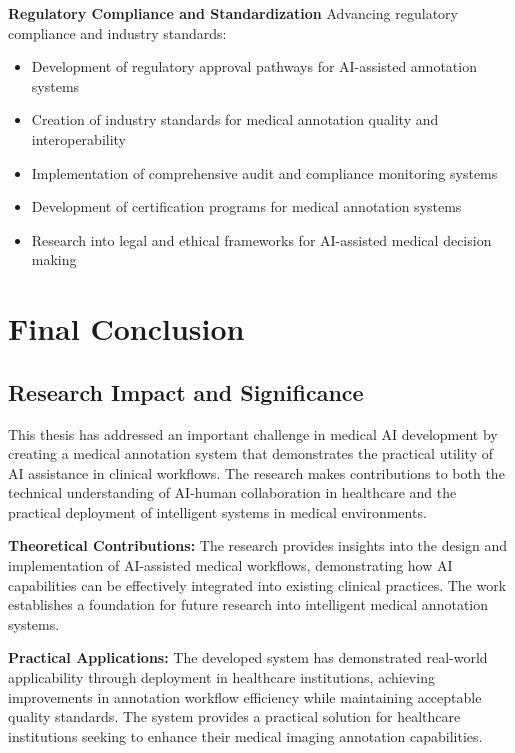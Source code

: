 \textbf{Regulatory Compliance and Standardization}
Advancing regulatory compliance and industry standards:

\begin{itemize}
    \item Development of regulatory approval pathways for AI-assisted annotation systems
    \item Creation of industry standards for medical annotation quality and interoperability
    \item Implementation of comprehensive audit and compliance monitoring systems
    \item Development of certification programs for medical annotation systems
    \item Research into legal and ethical frameworks for AI-assisted medical decision making
\end{itemize}

\section{Final Conclusion}

\subsection{Research Impact and Significance}

This thesis has addressed an important challenge in medical AI development by creating a medical annotation system that demonstrates the practical utility of AI assistance in clinical workflows. The research makes contributions to both the technical understanding of AI-human collaboration in healthcare and the practical deployment of intelligent systems in medical environments.

\textbf{Theoretical Contributions:} The research provides insights into the design and implementation of AI-assisted medical workflows, demonstrating how AI capabilities can be effectively integrated into existing clinical practices. The work establishes a foundation for future research into intelligent medical annotation systems.

\textbf{Practical Applications:} The developed system has demonstrated real-world applicability through deployment in healthcare institutions, achieving improvements in annotation workflow efficiency while maintaining acceptable quality standards. The system provides a practical solution for healthcare institutions seeking to enhance their medical imaging annotation capabilities.

